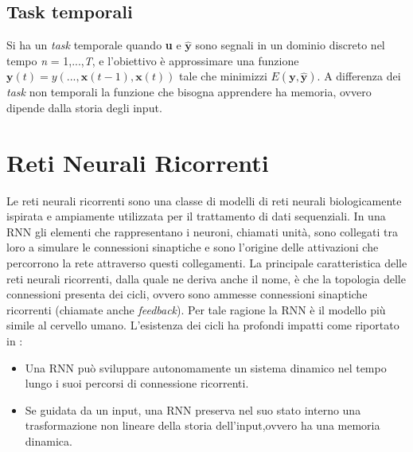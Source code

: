 \subsection{Task temporali}\label{sec:tt}
Si ha un \textit{task} temporale quando \textbf{u} e $\hat{\mathbf{y}}$ sono segnali in un dominio discreto nel tempo \textit{n} = 1,...,\textit{T}, e l'obiettivo è approssimare una funzione $\mathbf{y}(\mathit{t})=y(..., \mathbf{x}(\mathit{t - 1}),\mathbf{x}(\mathit{t}) )$
tale che minimizzi $E(\mathbf{y},\hat{\mathbf{y}})$.
A differenza dei \textit{task} non temporali la funzione che bisogna apprendere ha memoria, ovvero dipende dalla storia degli input.
\section{Reti Neurali Ricorrenti}\label{sec:rnn}

Le reti neurali ricorrenti sono una classe di modelli di reti neurali biologicamente ispirata e ampiamente utilizzata per il trattamento di dati sequenziali. In una RNN gli elementi che rappresentano i neuroni, chiamati unità, sono collegati tra loro a simulare le connessioni sinaptiche e sono l'origine delle attivazioni che percorrono la rete attraverso questi collegamenti. La principale caratteristica delle reti neurali ricorrenti, dalla quale ne deriva anche il nome, è che la topologia delle connessioni presenta dei cicli, ovvero sono ammesse connessioni sinaptiche ricorrenti (chiamate anche \textit{feedback}). Per tale ragione la RNN è il modello più simile al cervello umano. L'esistenza dei cicli ha profondi impatti come riportato in \cite{RCapproch:paper}:
\begin{itemize}
	\item Una RNN può sviluppare autonomamente un sistema dinamico nel tempo lungo i suoi percorsi di connessione ricorrenti.
	\item Se guidata da un input, una RNN preserva nel suo stato interno una trasformazione non lineare della storia dell'input,ovvero ha una memoria dinamica.\\
\end{itemize}

